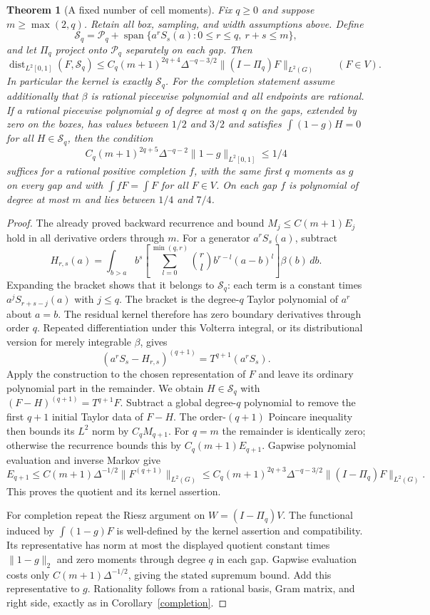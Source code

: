 \documentclass[11pt]{article}
\newtheorem{theorem}{Theorem}\newtheorem{lemma}{Lemma}\newtheorem{corollary}{Corollary}
\newcommand{\PP}{\mathcal P}
\begin{document}
\begin{theorem}[A fixed number of cell moments]\label{generalq}
Fix $q\ge0$ and suppose $m\ge\max(2,q)$. Retain all box, sampling,
and width assumptions above. Define
\[
 \mathcal S_q=\PP_q+
 \operatorname{span}\{a^rS_s(a):0\le r\le q,\ r+s\le m\},
\]
and let $\Pi_q$ project onto $\PP_q$ separately on each gap. Then
\[
 \operatorname{dist}_{L^2[0,1]}(F,\mathcal S_q)
 \le C_q(m+1)^{2q+4}\Delta^{-q-3/2}
                       \|(I-\Pi_q)F\|_{L^2(G)}\qquad(F\in V).
\]
In particular the kernel is exactly $\mathcal S_q$.
For the completion statement assume additionally that $\beta$ is rational
piecewise polynomial and all endpoints are rational.
If a rational piecewise polynomial $g$ of degree at most $q$ on the
gaps, extended by zero on the boxes, has values between $1/2$ and
$3/2$ and satisfies $\int(1-g)H=0$ for all $H\in\mathcal S_q$,
then the condition
\[
 C_q(m+1)^{2q+5}\Delta^{-q-2}\|1-g\|_{L^2[0,1]}\le1/4
\]
suffices for a rational positive completion $f$, with the same first
$q$ moments as $g$ on every gap and with $\int fF=\int F$ for all
$F\in V$. On each gap $f$ is polynomial of degree at most $m$ and
lies between $1/4$ and $7/4$.
\end{theorem}
\begin{proof}
The already proved backward recurrence and bound
$M_j\le C(m+1)E_j$ hold in all derivative orders through $m$.
For a generator $a^rS_s(a)$, subtract
\[
 H_{r,s}(a)=\int_{b>a}b^s
       \left[\sum_{l=0}^{\min(q,r)}\binom rl b^{r-l}(a-b)^l\right]
       \beta(b)\,db.
\]
Expanding the bracket shows that it belongs to $\mathcal S_q$:
each term is a constant times $a^j S_{r+s-j}(a)$ with $j\le q$.
The bracket is the degree-$q$ Taylor polynomial of $a^r$ about $a=b$.
The residual kernel therefore has zero boundary derivatives through
order $q$. Repeated differentiation under this Volterra integral,
or its distributional version for merely integrable $\beta$, gives
\[
 (a^rS_s-H_{r,s})^{(q+1)}=T^{q+1}(a^rS_s).
\]
Apply the construction to the chosen representation of $F$ and leave
its ordinary polynomial part in the remainder. We obtain
$H\in\mathcal S_q$ with $(F-H)^{(q+1)}=T^{q+1}F$.
Subtract a global degree-$q$ polynomial to remove the first $q+1$
initial Taylor data of $F-H$. The order-$(q+1)$ Poincare inequality
then bounds its $L^2$ norm by $C_q M_{q+1}$.
For $q=m$ the remainder is identically zero; otherwise the recurrence
bounds this by $C_q(m+1)E_{q+1}$.
Gapwise polynomial evaluation and inverse Markov give
\[
 E_{q+1}\le C(m+1)\Delta^{-1/2}\|F^{(q+1)}\|_{L^2(G)}
 \le C_q(m+1)^{2q+3}\Delta^{-q-3/2}
                         \|(I-\Pi_q)F\|_{L^2(G)}.
\]
This proves the quotient and its kernel assertion.

For completion repeat the Riesz argument on
$W=(I-\Pi_q)V$. The functional induced by $\int(1-g)F$ is well-defined
by the kernel assertion and compatibility. Its representative has norm
at most the displayed quotient constant times $\|1-g\|_2$ and zero
moments through degree $q$ in each gap. Gapwise evaluation costs only
$C(m+1)\Delta^{-1/2}$, giving the stated supremum bound. Add this
representative to $g$. Rationality follows from a rational basis,
Gram matrix, and right side, exactly as in Corollary~\ref{completion}.
\end{proof}
\end{document}
